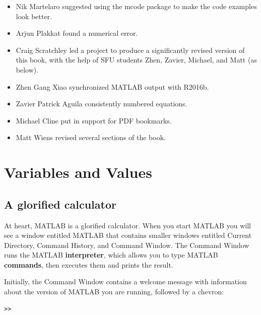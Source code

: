 \documentclass[
]{book}
\begin{document}
\begin{itemize}
\item Nik Martelaro suggested using the mcode package to make the
code examples look better.

\item Arjun Plakkat found a numerical error.

\item Craig Scratchley led a project to produce a significantly
revised version of this book, with the help of SFU students Zhen, Zavier,
Michael, and Matt (as below).

\item Zhen Gang Xiao synchronized MATLAB output with R2016b.

\item Zavier Patrick Aguila consistently numbered equations.

\item Michael Cline put in support for PDF bookmarks.

\item Matt Wiens revised several sections of the book.

\end{itemize}

\newpage


\tableofcontents

\mainmatter

\chapter{Variables and Values}

\section{A glorified calculator}
\label{sect:calc}

At heart, MATLAB is a glorified calculator.  When you start MATLAB
you will see a window
entitled {\sf MATLAB} that contains smaller windows entitled {\sf
Current Directory}, {\sf Command History}, and {\sf Command Window}.
The Command Window runs the MATLAB {\bf interpreter}, which allows you
to type MATLAB {\bf commands}, then executes them and prints the
result.

Initially, the Command Window contains a welcome message with information
about the version of MATLAB you are running, followed by a chevron:

\begin{verbatim}
>>
\end{verbatim}
\end{document}
